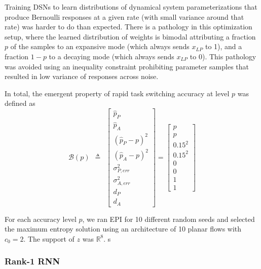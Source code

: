 \documentclass[11pt]{article}
\begin{document}
Training DSNs to learn distributions of dynamical system parameterizations that produce Bernoulli responses at a given rate (with small variance around that rate) was harder to do than expected.  There is a pathology in this optimization setup, where the learned distribution of weights is bimodal attributing a fraction $p$ of the samples to an expansive mode (which always sends $x_{LP}$ to 1), and a fraction $1-p$ to a decaying mode (which always sends $x_{LP}$ to 0).  This pathology was avoided using an inequality constraint prohibiting parameter samples that resulted in low variance of responses across noise.

In total, the emergent property of rapid task switching accuracy at level $p$ was defined as
\begin{equation}
\mathcal{B}(p) ~~\triangleq~~ \begin{bmatrix} \hat{p}_P \\ \hat{p}_A \\ (\hat{p}_P-p)^2 \\ (\hat{p}_A - p)^2 \\ \sigma^2_{P,err} \\ \sigma^2_{A,err} \\ d_P \\ d_A \end{bmatrix} = \begin{bmatrix} p \\ p \\ 0.15^2 \\ 0.15^2 \\ 0 \\ 0 \\ 1 \\ 1 \end{bmatrix}
\end{equation}

For each accuracy level $p$, we ran EPI for 10 different random seeds and selected the maximum entropy solution using an architecture of 10 planar flows with $c_0 = 2$. The support of $z$ was $\mathbb{R}^8$.
s
\subsubsection{Rank-1 RNN}\label{methods_LRRNN}
\end{document}
